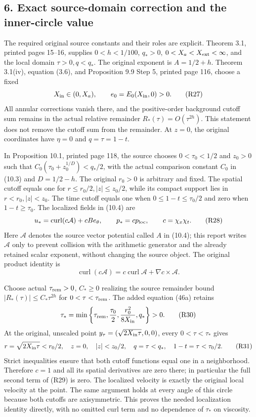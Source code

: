 \subsection*{6. Exact source-domain correction and the inner-circle value}

The required original source constants and their roles are explicit. Theorem 3.1, printed pages 15--16, supplies \(0<h<1/100\), \(q_*>0\), \(0<X_a<X_{\rm ext}<\infty\), and the local domain \(\tau>0,q<q_*\). The original exponent is \(A=1/2+h\). Theorem 3.1(iv), equation (3.6), and Proposition 9.9 Step 5, printed page 116, choose a fixed \[
X_{\rm in}\in(0,X_a),\qquad e_0=E_0(X_{\rm in},0)>0.
\tag{R27}
\] All annular corrections vanish there, and the positive-order background cutoff sum remains in the actual relative remainder \(R_*(\tau)=O(\tau^{2h})\). This statement does not remove the cutoff sum from the remainder. At \(z=0\), the original coordinates have \(\eta=0\) and \(q=\tau=1-t\).

In Proposition 10.1, printed page 118, the source chooses \(0<\tau_0<1/2\) and \(z_0>0\) such that \(C_0(\tau_0+z_0^{1/D})<q_*/2\), with the actual comparison constant \(C_0\) in (10.3) and \(D=1/2-h\). The original \(r_0>0\) is arbitrary and fixed. The spatial cutoff equals one for \(r\le r_0/2,|z|\le z_0/2\), while its compact support lies in \(r<r_0,|z|<z_0\). The time cutoff equals one when \(0\le1-t\le\tau_0/2\) and zero when \(1-t\ge\tau_0\). The localized fields in (10.4) are \[
u_* =\operatorname{curl}(c\mathcal A)+cB e_\theta,
\qquad p_*=cp_{\rm loc},\qquad c=\chi_x\chi_t.
\tag{R28}
\] Here \(\mathcal A\) denotes the source vector potential called \(A\) in (10.4); this report writes \(\mathcal A\) only to prevent collision with the arithmetic generator and the already retained scalar exponent, without changing the source object. The original product identity is \[
\operatorname{curl}(c\mathcal A)
=c\operatorname{curl}\mathcal A+\nabla c\times\mathcal A.
\tag{R29}
\]

Choose actual \(\tau_{\rm rem}>0\), \(C_*\ge0\) realizing the source remainder bound \(|R_*(\tau)|\le C_*\tau^{2h}\) for \(0<\tau<\tau_{\rm rem}\). The added equation (46a) retains \[
\tau_*=
\min\left\{\tau_{\rm rem},\frac{\tau_0}{2},
\frac{r_0^2}{8X_{\rm in}},q_*\right\}>0.
\tag{R30}
\] At the original, unscaled point \(y_\tau=(\sqrt{2X_{\rm in}\tau},0,0)\), every \(0<\tau<\tau_*\) gives \[
r=\sqrt{2X_{\rm in}\tau}<r_0/2,
\quad z=0,\quad |z|<z_0/2,
\quad q=\tau<q_*,\quad1-t=\tau<\tau_0/2.
\tag{R31}
\] Strict inequalities ensure that both cutoff functions equal one in a neighborhood. Therefore \(c=1\) and all its spatial derivatives are zero there; in particular the full second term of (R29) is zero. The localized velocity is exactly the original local velocity at the point. The same argument holds at every angle of this circle because both cutoffs are axisymmetric. This proves the needed localization identity directly, with no omitted curl term and no dependence of \(\tau_*\) on viscosity.

